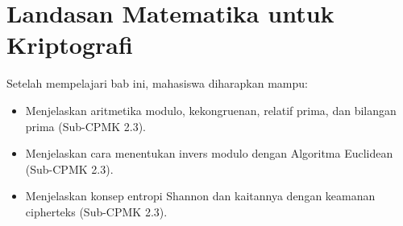\documentclass[../../main.tex]{subfiles}
\begin{document}
\chapter{Landasan Matematika untuk Kriptografi}
\label{chap:landasan-matematika}

\begin{learningoutcome}
Setelah mempelajari bab ini, mahasiswa diharapkan mampu:
\begin{itemize}
    \item Menjelaskan aritmetika modulo, kekongruenan, relatif prima, dan bilangan prima (Sub-CPMK 2.3).
    \item Menjelaskan cara menentukan invers modulo dengan Algoritma Euclidean (Sub-CPMK 2.3).
    \item Menjelaskan konsep entropi Shannon dan kaitannya dengan keamanan cipherteks (Sub-CPMK 2.3).
\end{itemize}
\end{learningoutcome}








\end{document}
